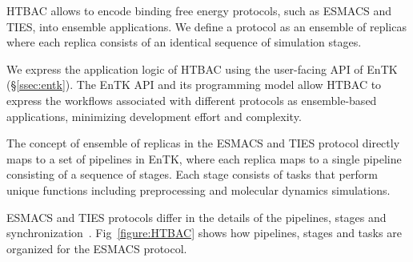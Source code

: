 HTBAC %
allows to %
encode binding free energy protocols, such as ESMACS and TIES, into ensemble
applications\@. We define a protocol as an ensemble of replicas where each
replica consists of an identical sequence of simulation stages.
 

We express the application logic of HTBAC using the user-facing API 
of EnTK (\S\ref{ssec:entk}). 
 
The EnTK %
API and its programming model 
 
allow HTBAC to express the workflows associated with different protocols as
ensemble-based applications, %
minimizing development effort and complexity.

The concept of %
ensemble of replicas in the ESMACS and TIES protocol directly maps to a set
of pipelines in EnTK, where each replica
 maps to a single
pipeline consisting of a sequence of stages. Each stage consists of tasks
that perform unique functions including preprocessing and molecular dynamics
simulations.  

ESMACS and TIES protocols differ in the details of the pipelines, stages and
synchronization~\cite{Bhati2017}.
Fig~\ref{figure:HTBAC} %
shows how pipelines, stages and tasks are organized for the ESMACS
protocol.

